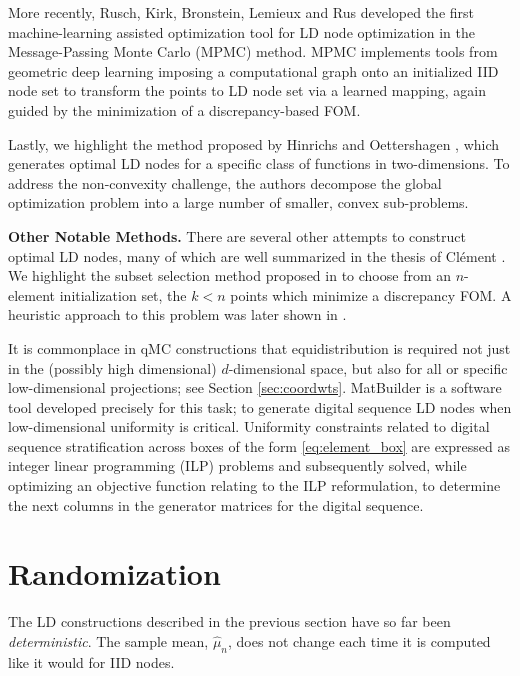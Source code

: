 \documentclass{svproc}
\begin{document}
More recently, Rusch, Kirk, Bronstein, Lemieux and Rus \cite{ruschkirk24} developed the first machine-learning assisted optimization tool for LD node optimization in the Message-Passing Monte Carlo (MPMC) method. MPMC implements tools from geometric deep learning imposing a computational graph onto an initialized IID node set to transform the points to LD node set via a learned mapping, again guided by the minimization of a discrepancy-based FOM. 

Lastly, we highlight the method proposed by Hinrichs and Oettershagen \cite{hinoet16}, which generates optimal LD nodes for a specific class of functions in two-dimensions. To address the non-convexity challenge, the authors decompose the global optimization problem into a large number of smaller, convex sub-problems.


\vspace{2mm}
\noindent
\textbf{Other Notable Methods.} 
There are several other attempts to construct optimal LD nodes, many of which are well summarized in the thesis of Cl\'{e}ment \cite{}. We highlight the subset selection method proposed in \cite{cle22} to choose from an $n$-element initialization set, the $k<n$ points which minimize a discrepancy FOM. A heuristic approach to this problem was later shown in \cite{cle24}. %

It is commonplace in qMC constructions that equidistribution is required not just in the (possibly high dimensional) $d$-dimensional space, but also for all or specific low-dimensional projections; see Section \ref{sec:coordwts}. MatBuilder \cite{paulin2022} is a software tool developed precisely for this task; to generate digital sequence LD nodes when low-dimensional uniformity is critical. Uniformity constraints related to digital sequence stratification across boxes of the form \eqref{eq:element_box} are expressed as integer linear programming (ILP) problems and subsequently solved, while optimizing an objective function relating to the ILP reformulation, to determine the next columns in the generator matrices for the digital sequence.


\section{Randomization} \label{sec:random}
The LD constructions described in the previous section have so far been \emph{deterministic}. The sample mean, $\hat{\mu}_n$, does not change each time it is computed like it would for IID nodes.
\end{document}
